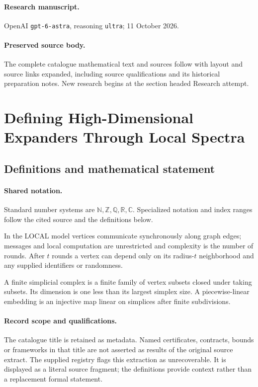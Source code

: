 \documentclass[11pt]{article}
\begin{document}
\paragraph{Research manuscript.} OpenAI \texttt{gpt-6-astra}, reasoning \texttt{ultra}; 11 October 2026.
\paragraph{Preserved source body.} The complete catalogue mathematical text and sources follow with layout and source links expanded, including source qualifications and its historical preparation notes. New research begins at the section headed Research attempt.

\section{Defining High-Dimensional Expanders Through Local Spectra}\label{statement}

\subsection{Definitions and mathematical statement}

\paragraph{Shared notation.}Standard number systems are $\mathbb N,\mathbb Z,\mathbb Q,\mathbb R,\mathbb C$. Specialized notation and index ranges follow the cited source and the definitions below.


In the LOCAL model vertices communicate synchronously along graph edges; messages and local computation are unrestricted and complexity is the number of rounds. After $t$ rounds a vertex can depend only on its radius-$t$ neighborhood and any supplied identifiers or randomness.

A finite simplicial complex is a finite family of vertex subsets closed under taking subsets. Its dimension is one less than its largest simplex size. A piecewise-linear embedding is an injective map linear on simplices after finite subdivisions.
\paragraph{Record scope and qualifications.}
The catalogue title is retained as metadata. Named certificates, contracts, bounds or frameworks in that title are not asserted as results of the original source extract.
The supplied registry flags this extraction as unrecoverable. It is displayed as a literal source fragment; the definitions provide context rather than a replacement formal statement.
\end{document}

